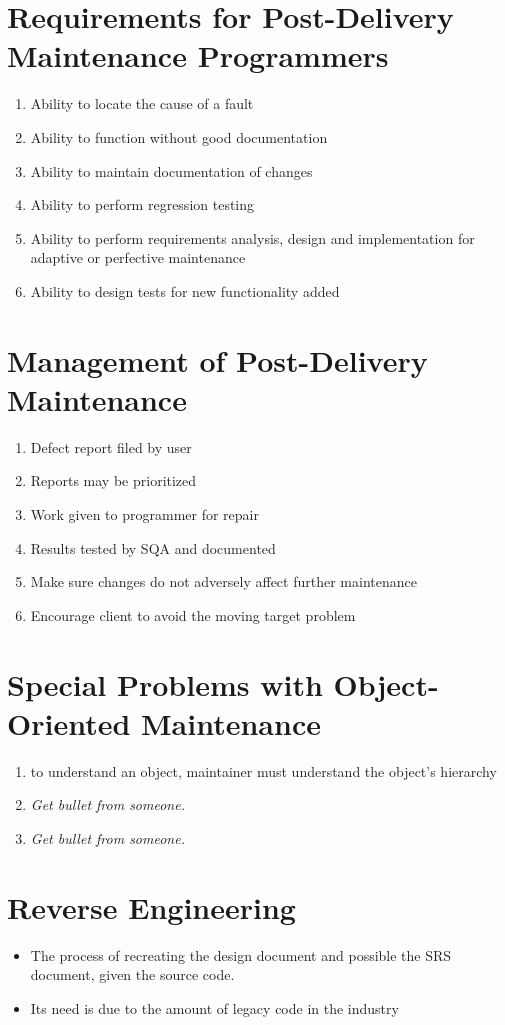\documentclass{report}
\begin{document}
		\section{Requirements for Post-Delivery Maintenance Programmers}
		    \begin{enumerate}
		    	\item Ability to locate the cause of a fault
		    	\item Ability to function without good documentation
		    	\item Ability to maintain documentation of changes
		    	\item Ability to perform regression testing
		    	\item Ability to perform requirements analysis, design and implementation for adaptive or perfective maintenance
		    	\item Ability to design tests for new functionality added
		    \end{enumerate}
		\section{Management of Post-Delivery Maintenance}
		    \begin{enumerate}
		    	\item Defect report filed by user
		    	\item Reports may be prioritized
		    	\item Work given to programmer for repair
		    	\item Results tested by SQA and documented
		    	\item Make sure changes do not adversely affect further maintenance
		    	\item Encourage client to avoid the moving target problem
		    \end{enumerate}
		\section{Special Problems with Object-Oriented Maintenance}
			\begin{enumerate}
				\item to understand an object, maintainer must understand the object's hierarchy
				\item \textit{Get bullet from someone.}
				\item \textit{Get bullet from someone.}
			\end{enumerate}
		\section{Reverse Engineering}
		    \begin{itemize}
		    	\item The process of recreating the design document and possible the SRS document, given the source code.
		    	\item Its need is due to the amount of legacy code in the industry
		    \end{itemize}
\end{document}
